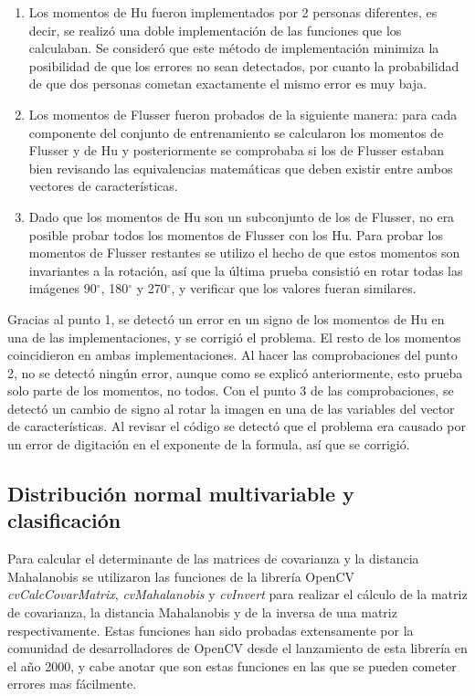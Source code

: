 \documentclass[a4paper, 11pt, oneside]{report}
\begin{document}
	\begin{enumerate}

	\item Los momentos de Hu fueron implementados por 2 personas diferentes, es decir, se realizó una doble implementación de las funciones que los calculaban. Se consideró que este método de implementación minimiza la posibilidad de que los errores no sean detectados, por cuanto la probabilidad de que dos personas cometan exactamente el mismo error es muy baja.
	
	\item Los momentos de Flusser fueron probados de la siguiente manera: para cada componente del conjunto de entrenamiento se calcularon los momentos de Flusser y de Hu y posteriormente se comprobaba si los de Flusser estaban bien revisando las equivalencias matemáticas que deben existir entre ambos vectores de características. %
	
	\item Dado que los momentos de Hu son un subconjunto de los de Flusser, no era posible probar todos los momentos de Flusser con los Hu. Para probar los momentos de Flusser restantes se utilizo el hecho de que estos momentos son invariantes a la rotación, así que la última prueba consistió en rotar todas las imágenes 90$^\circ$, 180$^\circ$ y 270$^\circ$, y verificar que los valores fueran similares.
	
	\end{enumerate}

Gracias al punto 1, se detectó un error en un signo de los momentos de Hu en una de las implementaciones, y se corrigió el problema. El resto de los momentos coincidieron en ambas implementaciones. Al hacer las comprobaciones del punto 2, no se detectó ningún error, aunque como se explicó anteriormente, esto prueba solo parte de los momentos, no todos. Con el punto 3 de las comprobaciones, se detectó un cambio de signo al rotar la imagen en una de las variables del vector de características. Al revisar el código se detectó que el problema era causado por un error de digitación en el exponente de la formula, así que se corrigió.

\subsection{Distribución normal multivariable y clasificación}

Para calcular el determinante de las matrices de covarianza y la distancia Mahalanobis se utilizaron las funciones de la librería OpenCV {\it cvCalcCovarMatrix}, {\it cvMahalanobis} y {\it cvInvert} para realizar el cálculo de la matriz de covarianza, la distancia Mahalanobis y de la inversa de una matriz respectivamente. Estas funciones han sido probadas extensamente por la comunidad de desarrolladores de OpenCV desde el lanzamiento de esta librería en el año 2000, y cabe anotar que son estas funciones en las que se pueden cometer errores mas fácilmente.
\end{document}
